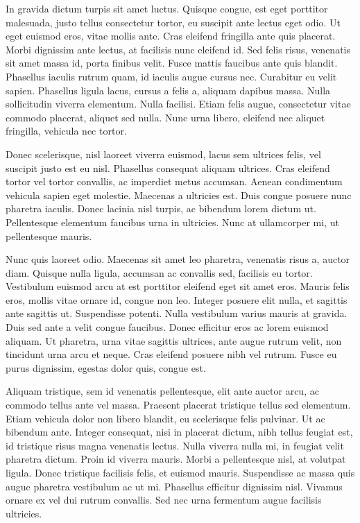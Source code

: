 \documentclass{article}
\begin{document}
In gravida dictum turpis sit amet luctus. Quisque congue, est eget
porttitor malesuada, justo tellus consectetur tortor, eu suscipit ante
lectus eget odio. Ut eget euismod eros, vitae mollis ante. Cras eleifend
fringilla ante quis placerat. Morbi dignissim ante lectus, at facilisis
nunc eleifend id. Sed felis risus, venenatis sit amet massa id, porta
finibus velit. Fusce mattis faucibus ante quis blandit. Phasellus
iaculis rutrum quam, id iaculis augue cursus nec. Curabitur eu velit
sapien. Phasellus ligula lacus, cursus a felis a, aliquam dapibus massa.
Nulla sollicitudin viverra elementum. Nulla facilisi. Etiam felis augue,
consectetur vitae commodo placerat, aliquet sed nulla. Nunc urna libero,
eleifend nec aliquet fringilla, vehicula nec tortor.

Donec scelerisque, nisl laoreet viverra euismod, lacus sem ultrices
felis, vel suscipit justo est eu nisl. Phasellus consequat aliquam
ultrices. Cras eleifend tortor vel tortor convallis, ac imperdiet metus
accumsan. Aenean condimentum vehicula sapien eget molestie. Maecenas a
ultricies est. Duis congue posuere nunc pharetra iaculis. Donec lacinia
nisl turpis, ac bibendum lorem dictum ut. Pellentesque elementum
faucibus urna in ultricies. Nunc at ullamcorper mi, ut pellentesque
mauris.

Nunc quis laoreet odio. Maecenas sit amet leo pharetra, venenatis risus
a, auctor diam. Quisque nulla ligula, accumsan ac convallis sed,
facilisis eu tortor. Vestibulum euismod arcu at est porttitor eleifend
eget sit amet eros. Mauris felis eros, mollis vitae ornare id, congue
non leo. Integer posuere elit nulla, et sagittis ante sagittis ut.
Suspendisse potenti. Nulla vestibulum varius mauris at gravida. Duis sed
ante a velit congue faucibus. Donec efficitur eros ac lorem euismod
aliquam. Ut pharetra, urna vitae sagittis ultrices, ante augue rutrum
velit, non tincidunt urna arcu et neque. Cras eleifend posuere nibh vel
rutrum. Fusce eu purus dignissim, egestas dolor quis, congue est.

Aliquam tristique, sem id venenatis pellentesque, elit ante auctor arcu,
ac commodo tellus ante vel massa. Praesent placerat tristique tellus sed
elementum. Etiam vehicula dolor non libero blandit, eu scelerisque felis
pulvinar. Ut ac bibendum ante. Integer consequat, nisi in placerat
dictum, nibh tellus feugiat est, id tristique risus magna venenatis
lectus. Nulla viverra nulla mi, in feugiat velit pharetra dictum. Proin
id viverra mauris. Morbi a pellentesque nisl, at volutpat ligula. Donec
tristique facilisis felis, et euismod mauris. Suspendisse ac massa quis
augue pharetra vestibulum ac ut mi. Phasellus efficitur dignissim nisl.
Vivamus ornare ex vel dui rutrum convallis. Sed nec urna fermentum augue
facilisis ultricies.
\end{document}
